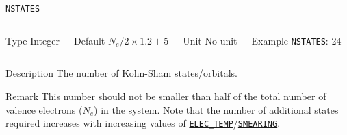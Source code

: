 \begin{frame}[allowframebreaks]{\texttt{NSTATES}} \label{NSTATES}
\vspace*{-12pt}
\begin{columns}
\begin{block}{Type}
Integer
\end{block}

\begin{block}{Default}
$N_e/2 \times 1.2 + 5$
\end{block}

\begin{block}{Unit}
No unit
\end{block}

\begin{block}{Example}
\texttt{NSTATES}: 24
\end{block}
\end{columns}

\begin{block}{Description}
The number of Kohn-Sham states/orbitals.
\end{block}

\begin{block}{Remark}
This number should not be smaller than half of
the total number of valence electrons ($N_e$) in the system. Note that the number of additional states required increases with increasing values of \hyperlink{ELEC_TEMP}{\texttt{ELEC\_TEMP}}/\hyperlink{SMEARING}{\texttt{SMEARING}}.
\end{block}

\end{frame}


